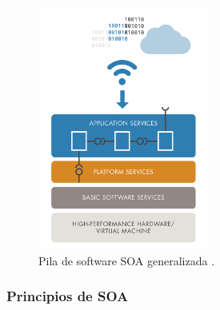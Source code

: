 \begin{figure}
    \centering
    \includegraphics[width=0.5\textwidth]{./imagenes/SOA.png}
    \caption{Pila de software SOA generalizada \cite{soa}.}
\end{figure}

\subsubsection{Principios de SOA}

